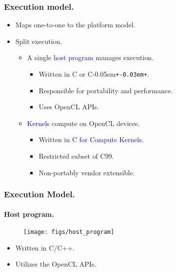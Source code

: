 \documentclass{beamer}
\newcommand{\Cpp}{C\kern-0.05em\texttt{+\kern-0.03em+}}
\begin{document}
\begin{frame}[fragile]
\frametitle{Execution model.}
  \begin{itemize}
  \item Maps one-to-one to the platform model.
  \item Split execution.
    \begin{itemize}
    \item A single \textcolor{blue}{host program} manages execution.
      \begin{itemize}
      \item Written in C or \Cpp{}.
      \item Responsible for portability and performance.
      \item Uses OpenCL APIs.
      \end{itemize}
    \item \textcolor{blue}{Kernels} compute on OpenCL devices.
      \begin{itemize}
      \item Written in \textcolor{blue}{C for Compute Kernels}.
      \item Restricted subset of C99.
      \item Non-portably vendor extensible.
      \end{itemize}
    \end{itemize}
  \end{itemize}
\end{frame}

\begin{frame}[fragile]
\frametitle{Execution Model.}
\framesubtitle{Host program.}
  \begin{center}
  \begin{figure}
  \texttt{[image: figs/host\_program]}
  \end{figure}
  \end{center}
  \begin{itemize}
  \item Written in C/C++.
  \item Utilizes the OpenCL APIs.
  \end{itemize}
\end{frame}
\end{document}
